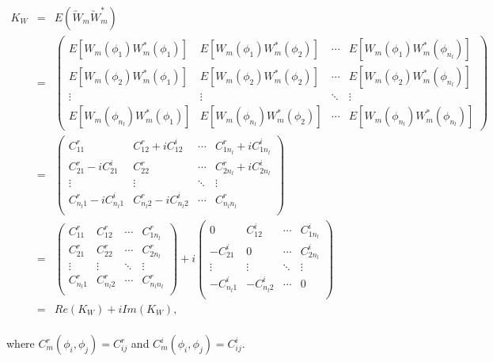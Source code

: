	\begin{eqnarray*}
		K_W & = & E(\utilde{W}_m\utilde{W}_m^*) \\
		& = &\left(\begin{array}{cccc}
		E[W_m(\phi_1) W_m^*(\phi_1) ] & E[W_m(\phi_1) W_m^*(\phi_2) ]  & \cdots & E[W_m(\phi_1) W_m^*(\phi_{n_l}) ]\\
		E[W_m(\phi_2) W_m^*(\phi_1) ] & E[W_m(\phi_2) W_m^*(\phi_2) ]  & \cdots & E[W_m(\phi_2) W_m^*(\phi_{n_l}) ]\\
		\vdots & \vdots  & \ddots & \vdots \\
		E[W_m(\phi_{n_l}) W_m^*(\phi_1) ] & E[W_m(\phi_{n_l}) W_m^*(\phi_2) ]  & \cdots & E[W_m(\phi_{n_l}) W_m^*(\phi_{n_l})]
		\end{array}
		\right)\\
		& = &\left(\begin{array}{cccc}
		C_{11}^r & C_{12}^r+iC_{12}^i & \cdots & C_{1n_l}^r+iC_{1n_l}^i\\
		C_{21}^r-iC_{21}^i & C_{22}^r & \cdots & C_{2n_l}^r+iC_{2n_l}^i\\
		\vdots & \vdots  & \ddots & \vdots \\
		C_{n_l1}^r-iC_{n_l1}^i & C_{n_l2}^r-iC_{n_l2}^i & \cdots & C_{n_ln_l}^r\\
		\end{array}
		\right) \\
		& = &\left(\begin{array}{cccc}
		C_{11}^r & C_{12}^r & \cdots & C_{1n_l}^r\\
		C_{21}^r & C_{22}^r & \cdots & C_{2n_l}^r\\
		\vdots & \vdots  & \ddots & \vdots \\
		C_{n_l1}^r & C_{n_l2}^r & \cdots & C_{n_ln_l}^r\\
		\end{array}
		\right) + i
		\left(\begin{array}{cccc}
		0 & C_{12}^i & \cdots & C_{1n_l}^i\\
		-C_{21}^i & 0 & \cdots & C_{2n_l}^i\\
		\vdots & \vdots  & \ddots & \vdots \\
		-C_{n_l1}^i & -C_{n_l2}^i & \cdots &  0\\
		\end{array}
		\right)\\
		&=& Re(K_W) + iIm(K_W), \\
	\end{eqnarray*}
	
	where $C_m^r(\phi_i, \phi_j) = C_{ij}^r$ and $C_m^i(\phi_i, \phi_j) = C_{ij}^i$.
	
